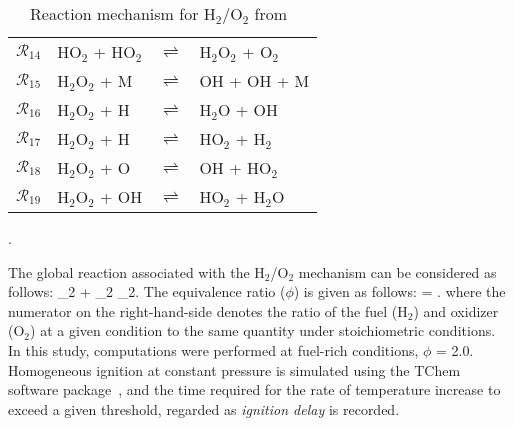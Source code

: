 \begin{table}[htbp]
\begin{center}
\begin{tabular}{llll}
$\mathcal{R}_{14}$ & HO$_2$ + HO$_2$ & $\rightleftharpoons$ & H$_2$O$_2$ + O$_2$ \\
$\mathcal{R}_{15}$ & H$_2$O$_2$ + M  & $\rightleftharpoons$ & OH + OH + M \\
$\mathcal{R}_{16}$ & H$_2$O$_2$ + H  & $\rightleftharpoons$ & H$_2$O + OH \\
$\mathcal{R}_{17}$ & H$_2$O$_2$ + H  & $\rightleftharpoons$ & HO$_2$ + H$_2$ \\
$\mathcal{R}_{18}$ & H$_2$O$_2$ + O  & $\rightleftharpoons$ & OH + HO$_2$ \\
$\mathcal{R}_{19}$ & H$_2$O$_2$ + OH & $\rightleftharpoons$ & HO$_2$ + H$_2$O \\
\bottomrule
\end{tabular}
\end{center}
\caption{Reaction mechanism for H$_2$/O$_2$ from~\cite{Yetter:1991}}.
\label{tab:kinetics}
\end{table}
%
The global reaction associated with the H$_2$/O$_2$ mechanism can
be considered as follows:
_2 + _2 _2.
\label{eq:global}
\ee 
The equivalence ratio ($\phi$) is given as follows:
%
\be
\phi = .
\label{eq:phi}
\ee
%
where the numerator on the right-hand-side denotes the ratio of the fuel (H$_2$)
and oxidizer (O$_2$) at a given condition to the same quantity under stoichiometric
conditions. In this study, computations were performed at fuel-rich conditions,
$\phi$ = 2.0. Homogeneous ignition at constant pressure is simulated using the
TChem software package~\cite{Safta:2011}, and the time required for the rate of
temperature increase to exceed a given threshold, regarded as \emph{ignition delay}
is recorded. 

